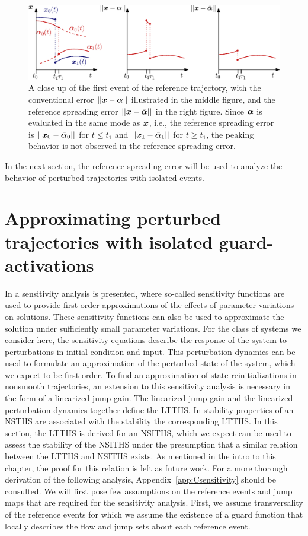 \documentclass[../DC2017114Bouma.tex]{subfiles}
\begin{document}
\begin{figure}[bt!]
\centering
\includegraphics[width=\textwidth]{refspreaderrors.eps}\caption{A close up of the first event of the reference trajectory, with the conventional error $||{\boldsymbol{x}}-\boldsymbol{\alpha}||$ illustrated in the middle figure, and the reference spreading error $||{\boldsymbol{x}}-\bar{\boldsymbol{\alpha}}||$ in the right figure. Since $\bar{\boldsymbol{\alpha}}$ is evaluated in the same mode as ${\boldsymbol{x}}$, i.e., the reference spreading error is $||{\boldsymbol{x}}_0 - \bar{\boldsymbol{\alpha}}_0||$ for $t\leq t_1$ and $||{\boldsymbol{x}}_1 - \bar{\boldsymbol{\alpha}}_1||$ for $t\geq t_1$, the peaking behavior is not observed in the reference spreading error.}\label{fig:3refspreaderrors}
\end{figure}

In the next section, the reference spreading error will be used to analyze the behavior of perturbed trajectories with isolated events.

\section{Approximating perturbed trajectories with isolated guard-activations}\label{sec:3approx}
In \cite{Khalil1996} a sensitivity analysis is presented, where so-called sensitivity functions are used to provide first-order approximations of the effects of parameter variations on solutions. These sensitivity functions can also be used to approximate the solution under sufficiently small parameter variations. For the class of systems we consider here, the sensitivity equations describe the response of the system to perturbations in initial condition and input. This perturbation dynamics can be used to formulate an approximation of the perturbed state of the system, which we expect to be first-order. To find an approximation of state reinitializations in nonsmooth trajectories, an extension to this sensitivity analysis is necessary in the form of a linearized jump gain. The linearized jump gain and the linearized perturbation dynamics together define the LTTHS. In \cite{Rijnen2017} stability properties of an NSTHS are associated with the stability the corresponding LTTHS. In this section, the LTTHS is derived for an NSITHS, which we expect can be used to assess the stability of the NSITHS under the presumption that a similar relation between the LTTHS and NSITHS exists. As mentioned in the intro to this chapter, the proof for this relation is left as future work. For a more thorough derivation of the following analysis, Appendix~\ref{app:Csensitivity} should be consulted. We will first pose few assumptions on the reference events and jump maps that are required for the sensitivity analysis. First, we assume transversality of the reference events for which we assume the existence of a guard function that locally describes the flow and jump sets about each reference event.
\end{document}

